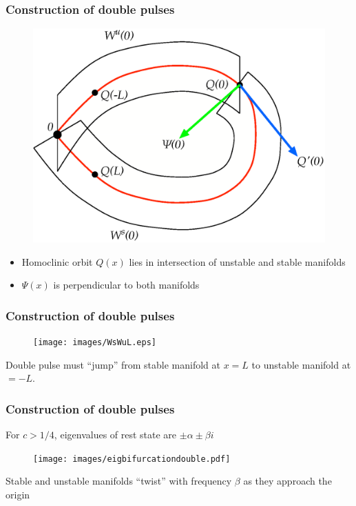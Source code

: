 \documentclass[16pt]{beamer}
\begin{document}
\begin{frame}
	\frametitle{Construction of double pulses}
	\fontsize{16}{7.2}\selectfont
	\begin{figure}
	\begin{center}
	\includegraphics[width=0.6\linewidth]{images/WsWu}
	\end{center}
	\end{figure}
	\begin{itemize}
		\item Homoclinic orbit $Q(x)$ lies in intersection of unstable and stable manifolds
		\item $\Psi(x)$ is perpendicular to both manifolds
	\end{itemize}
\end{frame}

\begin{frame}
	\frametitle{Construction of double pulses}
	\fontsize{16}{7.2}\selectfont
	\begin{figure}
	\begin{center}
	\texttt{[image: images/WsWuL.eps]}
	\end{center}
	\end{figure}
	Double pulse must ``jump'' from stable manifold at $x = L$ to unstable manifold at $ = -L$.
\end{frame}

\begin{frame}
	\frametitle{Construction of double pulses}
	\fontsize{16}{7.2}\selectfont
	For $c > 1/4$, eigenvalues of rest state are $\pm \alpha \pm \beta i$
	\begin{figure}
	\begin{center}
	\texttt{[image: images/eigbifurcationdouble.pdf]}
	\end{center}
	\end{figure}
	Stable and unstable manifolds ``twist'' with frequency $\beta$ as they approach the origin
\end{frame}
\end{document}
